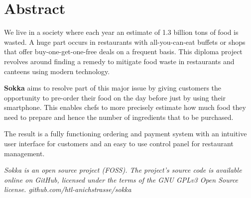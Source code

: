 \section*{Abstract}

We live in a society where each year an estimate of 1.3 billion tons of food is wasted. A huge part occurs in restaurants with all-you-can-eat buffets or shops that offer buy-one-get-one-free deals on a frequent basis. \cite{depta2018} This diploma project revolves around finding a remedy to mitigate food waste in restaurants and canteens using modern technology.

\textbf{Sokka} aims to resolve part of this major issue by giving customers the opportunity to pre-order their food on the day before just by using their smartphone. This enables chefs to more precisely estimate how much food they need to prepare and hence the number of ingredients that to be purchased.

The result is a fully functioning ordering and payment system with an intuitive user interface for customers and an easy to use control panel for restaurant management.

\textit{Sokka is an open source project (FOSS). The project's source code is available online on GitHub, licensed under the terms of the GNU GPLv3 Open Source license. github.com/htl-anichstrasse/sokka}

\newpage